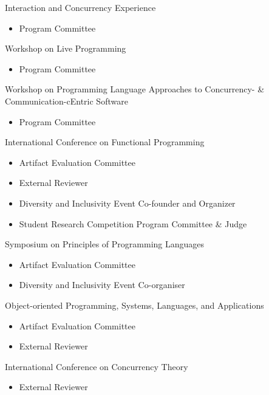 \cvevent
{Interaction and Concurrency Experience}
{}{}{}
\begin{itemize}
\item Program Committee 
\end{itemize}

\divider

\cvevent
{Workshop on Live Programming}
{}{}{}
\begin{itemize}
\item Program Committee 
\end{itemize}

\divider

\cvevent
{Workshop on Programming Language Approaches to Concurrency- \& Communication-cEntric Software}
{}{}{}
\begin{itemize}
\item Program Committee 
\end{itemize}

\divider

\cvevent
{International Conference on Functional Programming}
{}{}{}
\begin{itemize}
\item Artifact Evaluation Committee 
\item External Reviewer 
\item Diversity and Inclusivity Event Co-founder and Organizer 
\item Student Research Competition Program Committee \& Judge 
\end{itemize}

\divider

\cvevent
{Symposium on Principles of Programming Languages}
{}{}{}
\begin{itemize}
\item Artifact Evaluation Committee 
\item Diversity and Inclusivity Event Co-organiser 
\end{itemize}

\divider

\cvevent
{Object-oriented Programming, Systems, Languages, and Applications}
{}{}{}
\begin{itemize}
\item Artifact Evaluation Committee 
\item External Reviewer 
\end{itemize}

\divider

\cvevent
{International Conference on Concurrency Theory}
{}{}{}
\begin{itemize}
\item External Reviewer 
\end{itemize}
